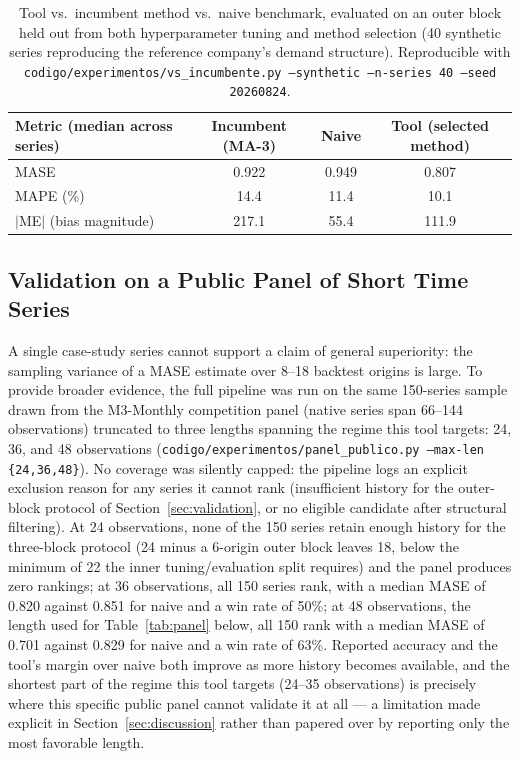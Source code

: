 \documentclass[forecasting,article,submit,pdftex,moreauthors]{Definitions/mdpi}
\begin{document}
\begin{table}[H]
\caption{Tool vs.\ incumbent method vs.\ naive benchmark, evaluated on an outer block held out from both hyperparameter tuning and method selection (40 synthetic series reproducing the reference company's demand structure). Reproducible with \texttt{codigo/\allowbreak experimentos/\allowbreak vs\_\allowbreak incumbente.py --synthetic --n-series 40 --seed 20260824}.\label{tab:incumbente}}
\centering
\begin{tabularx}{\textwidth}{Xccc}
\toprule
\textbf{Metric (median across series)} & \textbf{Incumbent (MA-3)} & \textbf{Naive} & \textbf{Tool (selected method)} \\
\midrule
MASE   & 0.922 & 0.949 & 0.807 \\
MAPE (\%) & 14.4 & 11.4 & 10.1 \\
$|$ME$|$ (bias magnitude) & 217.1 & 55.4 & 111.9 \\
\bottomrule
\end{tabularx}
\end{table}

\subsection{Validation on a Public Panel of Short Time Series}
\label{sec:panel}

A single case-study series cannot support a claim of general superiority: the sampling variance of a MASE estimate over 8--18 backtest origins is large. To provide broader evidence, the full pipeline was run on the same 150-series sample drawn from the M3-Monthly competition panel \cite{makridakis2020m3} (native series span 66--144 observations) truncated to three lengths spanning the regime this tool targets: 24, 36, and 48 observations (\texttt{codigo/\allowbreak experimentos/\allowbreak panel\_\allowbreak publico.py --max-len \{24,36,48\}}). No coverage was silently capped: the pipeline logs an explicit exclusion reason for any series it cannot rank (insufficient history for the outer-block protocol of Section~\ref{sec:validation}, or no eligible candidate after structural filtering). At 24 observations, none of the 150 series retain enough history for the three-block protocol (24 minus a 6-origin outer block leaves 18, below the minimum of 22 the inner tuning/evaluation split requires) and the panel produces zero rankings; at 36 observations, all 150 series rank, with a median MASE of 0.820 against 0.851 for naive and a win rate of 50\%; at 48 observations, the length used for Table~\ref{tab:panel} below, all 150 rank with a median MASE of 0.701 against 0.829 for naive and a win rate of 63\%. Reported accuracy and the tool's margin over naive both improve as more history becomes available, and the shortest part of the regime this tool targets (24--35 observations) is precisely where this specific public panel cannot validate it at all --- a limitation made explicit in Section~\ref{sec:discussion} rather than papered over by reporting only the most favorable length.
\end{document}
